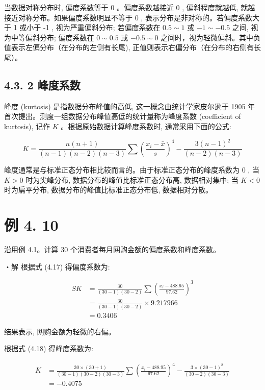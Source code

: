 \documentclass[10pt]{article}
\begin{document}
\begin{CJK*}{UTF8}{bsmi}
当数据对称分布时, 偏度系数等于 0 。偏度系数越接近 0 , 偏斜程度就越低, 就越接近对称分布。如果偏度系数明显不等于 0 , 表示分布是非对称的。若偏度系数大于 1 或小于 -1 , 视为严重偏斜分布; 若偏度系数在 $0.5 \sim 1$ 或 $-1 \sim-0.5$ 之间, 视为中等偏斜分布; 偏度系数在 $0 \sim 0.5$ 或 $-0.5 \sim 0$ 之间时，视为轻微偏斜。其中负值表示左偏分布（在分布的左侧有长尾), 正值则表示右偏分布（在分布的右侧有长尾）。

\subsection*{4.3. 2 峰度系数}
峰度 (kurtosis) 是指数据分布峰值的高低, 这一概念由统计学家皮尔逊于 1905 年首次提出。测度一组数据分布峰值高低的统计量称为峰度系数 (coefficient of kurtosis), 记作 $K$ 。根据原始数据计算峰度系数时, 通常采用下面的公式:


\begin{equation*}
K=\frac{n(n+1)}{(n-1)(n-2)(n-3)} \sum\left(\frac{x_{i}-\bar{x}}{s}\right)^{4}-\frac{3(n-1)^{2}}{(n-2)(n-3)} \tag{4.18}
\end{equation*}


峰度通常是与标准正态分布相比较而言的。由于标准正态分布的峰度系数为 0 , 当 $K>0$ 时为尖峰分布, 数据分布的峰值比标准正态分布高, 数据相对集中; 当 $K<0$ 时为扁平分布, 数据分布的峰值比标准正态分布低, 数据相对分散。

\section*{例 4. 10}
沿用例 4.1。计算 30 个消费者每月网购金额的偏度系数和峰度系数。

・解 根据式 (4.17) 得偏度系数为:

$$
\begin{aligned}
S K & =\frac{30}{(30-1)(30-2)} \sum\left(\frac{x_{i}-488.95}{97.62}\right)^{3} \\
& =\frac{30}{(30-1)(30-2)} \times 9.217966 \\
& =0.3406
\end{aligned}
$$

结果表示, 网购金额为轻微的右偏。

根据式 (4.18) 得峰度系数为:

$$
\begin{aligned}
K & =\frac{30 \times(30+1)}{(30-1)(30-2)(30-3)} \sum\left(\frac{x_{i}-488.95}{97.62}\right)^{4}-\frac{3 \times(30-1)^{2}}{(30-2)(30-3)} \\
& =-0.4075
\end{aligned}
$$


\end{CJK*}
\end{document}
